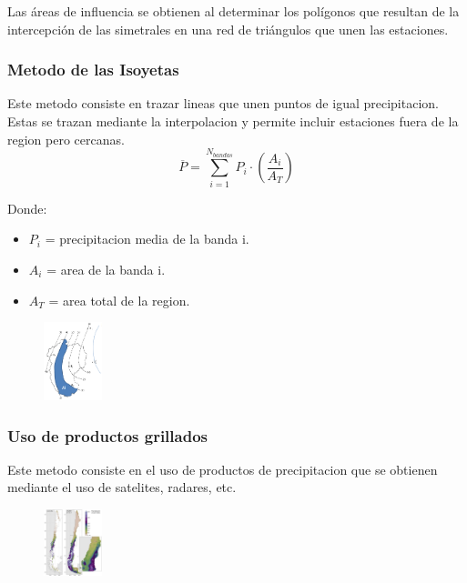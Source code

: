 Las áreas de influencia se obtienen al determinar los polígonos que resultan de la intercepción de las simetrales en una red de triángulos que unen las estaciones.

\subsubsection{Metodo de las Isoyetas}

Este metodo consiste en trazar lineas que unen puntos de igual precipitacion.\\
Estas se trazan mediante la interpolacion y permite incluir estaciones fuera de la region pero cercanas.\\

\begin{equation}
    \overline{P} = \sum_{i=1}^{N_{bandas}} P_i \cdot (\frac{A_i}{A_T})
\end{equation}

Donde:
\begin{itemize}
    \item $P_i$ = precipitacion media de la banda i.
    \item $A_i$ = area de la banda i.
    \item $A_T$ = area total de la region.
\end{itemize}

\begin{figure}[H]
    \centering
    \includegraphics[width=0.15\textwidth]{imagenes/isoyetas.png}
    \label{isoyetas}
\end{figure}

\subsubsection{Uso de productos grillados}

Este metodo consiste en el uso de productos de precipitacion que se obtienen mediante el uso de satelites, radares, etc.\\

\begin{figure}[H]
    \centering
    \includegraphics[width=0.15\textwidth]{imagenes/productos_grillados.png}
    \label{productos_grillados}
\end{figure}

